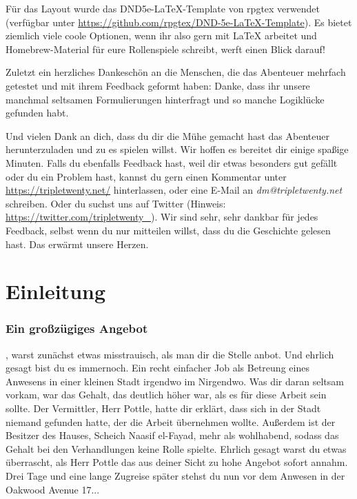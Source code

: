 Für das Layout wurde das DND5e-LaTeX-Template von rpgtex verwendet (verfügbar unter \url{https://github.com/rpgtex/DND-5e-LaTeX-Template}).
Es bietet ziemlich viele coole Optionen, wenn ihr also gern mit LaTeX arbeitet und Homebrew-Material für eure Rollenspiele schreibt, werft einen Blick darauf!

Zuletzt ein herzliches Dankeschön an die Menschen, die das Abenteuer mehrfach getestet und mit ihrem Feedback geformt haben: %
Danke, dass ihr unsere manchmal seltsamen Formulierungen hinterfragt und so manche Logiklücke gefunden habt.

Und vielen Dank an dich, dass du dir die Mühe gemacht hast das Abenteuer herunterzuladen und zu es spielen willst.
Wir hoffen es bereitet dir einige spaßige Minuten.
Falls du ebenfalls Feedback hast, weil dir etwas besonders gut gefällt oder du ein Problem hast, kannst du gern einen Kommentar unter \url{https://tripletwenty.net/} hinterlassen,
oder eine E-Mail an \textit{dm@tripletwenty.net} schreiben.
Oder du suchst uns auf Twitter (Hinweis: \url{https://twitter.com/tripletwenty_}).
Wir sind sehr, sehr dankbar für jedes Feedback, selbst wenn du nur mitteilen willst, dass du die Geschichte gelesen hast.
Das erwärmt unsere Herzen.


\chapter*{Einleitung}

\subsection{Ein großzügiges Angebot}

, warst zunächst etwas misstrauisch, als man dir die Stelle anbot.
Und ehrlich gesagt bist du es immernoch.
Ein recht einfacher Job als Betreung eines Anwesens in einer kleinen Stadt irgendwo im Nirgendwo.
Was dir daran seltsam vorkam, war das Gehalt, das deutlich höher war, als es für diese Arbeit sein sollte.
Der Vermittler, Herr Pottle, hatte dir erklärt, dass sich in der Stadt niemand gefunden hatte, der die Arbeit übernehmen wollte.
Außerdem ist der Besitzer des Hauses, Scheich Naasif el-Fayad, mehr als wohlhabend, sodass das Gehalt bei den Verhandlungen keine Rolle spielte.
Ehrlich gesagt warst du etwas überrascht, als Herr Pottle das aus deiner Sicht zu hohe Angebot sofort annahm.
Drei Tage und eine lange Zugreise später stehst du nun vor dem Anwesen in der Oakwood Avenue 17...

